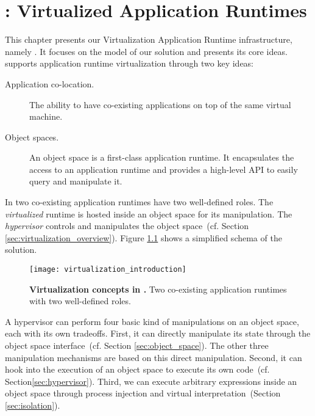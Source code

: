 

\chapter{\VTT: Virtualized Application Runtimes}
\minitoc
\introduction

This chapter presents our Virtualization Application Runtime infrastructure, namely \VTT. It focuses on the model of our solution and presents its core ideas. \VTT supports application runtime virtualization through two key ideas:

\begin{description}
\item[Application co-location.] The ability to have co-existing applications on top of the same virtual machine. 
\item[Object spaces.] An object space is a first-class application runtime. It encapsulates the access to an application runtime and provides a high-level API to easily query and manipulate it.
\end{description}

In \Vtt two co-existing application runtimes have two well-defined roles. The \emph{virtualized} runtime is hosted inside an object space for its manipulation. The \emph{hypervisor} controls and manipulates the object space~(cf. Section \ref{sec:virtualization_overview}).
Figure \ref{fig:virtualization_introduction} shows a simplified schema of the solution.

\begin{figure}[htb]
\begin{center}
\texttt{[image: virtualization\_introduction]}
\caption{\textbf{Virtualization concepts in \Vtt.} Two co-existing application runtimes with two well-defined roles.\label{fig:virtualization_introduction}}
\end{center}
\end{figure}

A hypervisor can perform four basic kind of manipulations on an object space, each with its own tradeoffs. First, it can directly manipulate its state through the object space interface~(cf. Section \ref{sec:object_space}). The other three manipulation mechanisms are based on this direct manipulation. Second, it can hook into the execution of an object space to execute its own code~(cf. Section\ref{sec:hypervisor}). Third, we can execute arbitrary expressions inside an object space through process injection and virtual interpretation~(Section \ref{sec:isolation}). %


